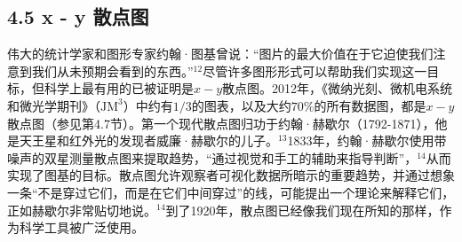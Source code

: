 \subsection*{4.5 x - y 散点图}
伟大的统计学家和图形专家约翰·图基曾说：“图片的最大价值在于它迫使我们注意到我们从未预期会看到的东西。”${ }^{12}$尽管许多图形形式可以帮助我们实现这一目标，但科学上最有用的已被证明是$x-y$散点图。2012年，《微纳光刻、微机电系统和微光学期刊》（$\mathrm{JM}^{3}$）中约有$1/3$的图表，以及大约$70\%$的所有数据图，都是$x-y$散点图（参见第4.7节）。第一个现代散点图归功于约翰·赫歇尔（1792-1871），他是天王星和红外光的发现者威廉·赫歇尔的儿子。${ }^{13}$1833年，约翰·赫歇尔使用带噪声的双星测量散点图来提取趋势，“通过视觉和手工的辅助来指导判断”，${ }^{14}$从而实现了图基的目标。散点图允许观察者可视化数据所暗示的重要趋势，并通过想象一条“不是穿过它们，而是在它们中间穿过”的线，可能提出一个理论来解释它们，正如赫歇尔非常贴切地说。${ }^{14}$到了1920年，散点图已经像我们现在所知的那样，作为科学工具被广泛使用。

